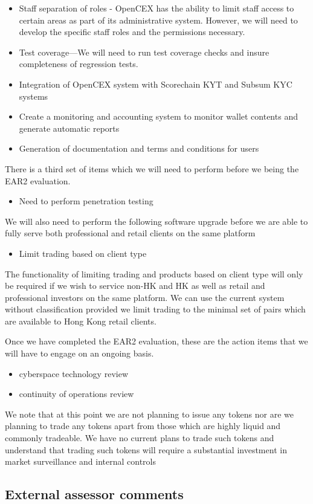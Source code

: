 \documentclass[]{report}
\begin{document}
\begin{itemize}

\item Staff separation of roles - OpenCEX has the ability to limit
  staff access to certain areas as part of its administrative system.
  However, we will need to develop the specific staff roles and the
  permissions necessary.

\item Test coverage—We will need to run test coverage checks and
  insure completeness of regression tests.

\item Integration of OpenCEX system with Scorechain KYT and Subsum KYC
  systems

\item Create a monitoring and accounting system to monitor wallet
  contents and generate automatic reports

\item Generation of documentation and terms and conditions for users

\end{itemize}

There is a third set of items which we will need to perform
before we being the EAR2 evaluation.

\begin{itemize}
\item Need to perform penetration testing
\end{itemize}

We will also need to perform the following software upgrade before we
are able to fully serve both professional and retail clients on the
same platform
\begin{itemize}
\item Limit trading based on client type
\end{itemize}
The functionality of limiting trading and products based on client
type will only be required if we wish to service non-HK and HK as well
as retail and professional investors on the same platform.  We can use
the current system without classification provided we limit trading to
the minimal set of pairs which are available to Hong Kong retail clients.

Once we have completed the EAR2 evaluation, these are the action items
that we will have to engage on an ongoing basis.

\begin{itemize}
\item cyberspace technology review
\item continuity of operations review
\end{itemize}

We note that at this point we are not planning to issue any tokens nor
are we planning to trade any tokens apart from those which are highly
liquid and commonly tradeable.  We have no current plans to trade such
tokens and understand that trading such tokens will require a
substantial investment in market surveillance and internal controls

\subsection{External assessor comments}
\end{document}
